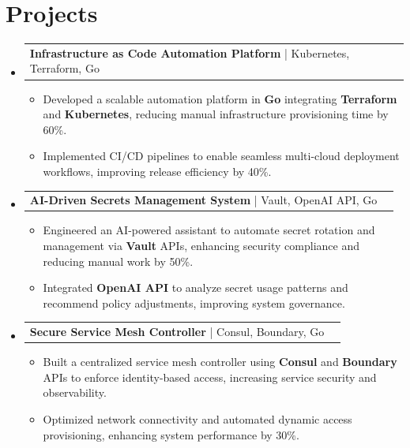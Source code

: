 \documentclass[letterpaper,11pt]{article}
\makeatletter
\newcommand{\resumeItem}[1]{
  \item\footnotesize{
    {#1 \vspace{-2pt}}
  }
}
\newcommand{\resumeProjectHeading}[2]{
    \item
    \begin{tabular*}{1.001\textwidth}{l@{\extracolsep{\fill}}r}
      \small#1 & \textbf{\small #2}\\
    \end{tabular*}\vspace{-7pt}
}
\newcommand{\resumeSubHeadingListStart}{\begin{itemize}[leftmargin=0pt, label={}]}
\newcommand{\resumeSubHeadingListEnd}{\end{itemize}}
\newcommand{\resumeItemListStart}{\begin{itemize}[leftmargin=*]}
\newcommand{\resumeItemListEnd}{\end{itemize}\vspace{-5pt}}
\makeatother
\begin{document}
\section{Projects}
    \vspace{-5pt}
    \resumeSubHeadingListStart
      \resumeProjectHeading
          {\textbf{Infrastructure as Code Automation Platform} | Kubernetes, Terraform, Go}{}
          \resumeItemListStart
              \resumeItem{Developed a scalable automation platform in \textbf{Go} integrating \textbf{Terraform} and \textbf{Kubernetes}, reducing manual infrastructure provisioning time by 60\%.}
              \resumeItem{Implemented CI/CD pipelines to enable seamless multi-cloud deployment workflows, improving release efficiency by 40\%.}
          \resumeItemListEnd
          \vspace{-12pt}
      \resumeProjectHeading
          {\textbf{AI-Driven Secrets Management System} | Vault, OpenAI API, Go}{}
          \resumeItemListStart
              \resumeItem{Engineered an AI-powered assistant to automate secret rotation and management via \textbf{Vault} APIs, enhancing security compliance and reducing manual work by 50\%.}
              \resumeItem{Integrated \textbf{OpenAI API} to analyze secret usage patterns and recommend policy adjustments, improving system governance.}
          \resumeItemListEnd
          \vspace{-12pt}
      \resumeProjectHeading
          {\textbf{Secure Service Mesh Controller} | Consul, Boundary, Go}{}
          \resumeItemListStart
              \resumeItem{Built a centralized service mesh controller using \textbf{Consul} and \textbf{Boundary} APIs to enforce identity-based access, increasing service security and observability.}
              \resumeItem{Optimized network connectivity and automated dynamic access provisioning, enhancing system performance by 30\%.}
          \resumeItemListEnd 
    \resumeSubHeadingListEnd
\end{document}
